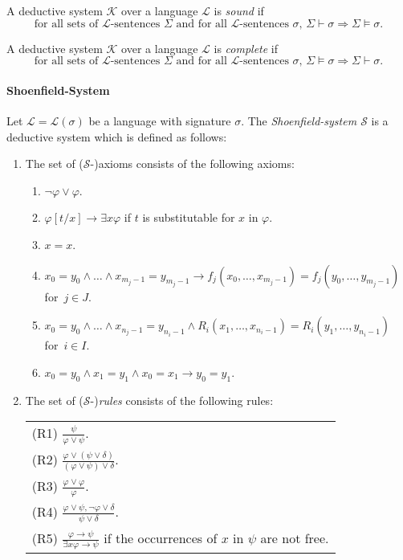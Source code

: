 A deductive system $\mathcal{K}$ over a language $\mathcal{L}$ is \textit{sound} if
\[ \text{for all sets of }\mathcal{L}\text{-sentences }\Sigma\text{ and for all }\mathcal{L}\text{-sentences }\sigma\text{, }\Sigma \vdash \sigma \Rightarrow \Sigma \vDash \sigma. \]

A deductive system $\mathcal{K}$ over a language $\mathcal{L}$ is \textit{complete} if 
\[ \text{for all sets of }\mathcal{L}\text{-sentences }\Sigma\text{ and for all }\mathcal{L}\text{-sentences }\sigma\text{, }\Sigma \vDash \sigma \Rightarrow \Sigma \vdash \sigma. \]


\paragraph{Shoenfield-System}
Let $\mathcal{L}= \mathcal{L}(\sigma)$ be a language with signature $\sigma $. The \textit{Shoenfield-system $\mathcal{S}$} is a deductive system which is defined as follows: 
\begin{enumerate}
\item The set of ($\mathcal{S}$-)axioms consists of the following axioms:
\begin{enumerate}[label=({A\arabic*})]
\item $\lnot \varphi \vee \varphi$.
\item $\varphi[t/x] \rightarrow \exists x \varphi$ if $t$ is substitutable for $x$ in $\varphi$.
\item $x=x$.
\item $x_0 = y_0 \wedge \ldots \wedge x_{m_j-1} = y_{m_j-1} \rightarrow f_j(x_0, \ldots, x_{m_j-1}) = f_j(y_0, \ldots, y_{m_j-1})$ for~$j \in J$.
\item $x_0 = y_0 \wedge \ldots \wedge x_{n_j-1} = y_{n_i-1} \wedge R_i(x_1, \ldots, x_{n_i-1})=R_i(y_1, \ldots, y_{n_i-1})$ for~$i \in I$.
\item $x_0 = y_0 \wedge x_1 = y_1 \wedge x_0 = x_1 \rightarrow y_0 = y_1$.
\end{enumerate}

\item The set of ($\mathcal{S}$-)\textit{rules} consists of the following rules: 

\begin{tabular}{l}
(R1) \(\displaystyle \frac{\psi}{\varphi \vee \psi}  \). \\[10pt] (R2) \( \displaystyle\frac{\varphi \vee ( \psi \vee \delta )}{(\varphi \vee \psi) \vee \delta}\). \\[10pt] (R3) \( \displaystyle\frac{\varphi \vee \varphi}{\varphi}\). \\[10pt] (R4) \( \displaystyle\frac{\varphi \vee \psi, \lnot \varphi \vee \delta}{\psi \vee \delta} \). \\[10pt]
(R5) \( \displaystyle \frac{\varphi \rightarrow \psi}{\exists x \varphi \rightarrow \psi} \) if the occurrences of $x$ in $\psi$ are not free.
\end{tabular}

\end{enumerate}

